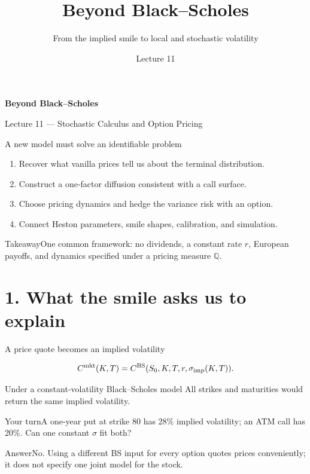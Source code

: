 \documentclass[handout,10pt,t,aspectratio=169]{beamer}
\title{Beyond Black--Scholes}\subtitle{From the implied smile to local and stochastic volatility}\author{}\date{Lecture 11}
\newenvironment{pausebox}{\begin{block}{Your turn}}{\end{block}}
\newenvironment{answerbox}{\begin{exampleblock}{Answer}}{\end{exampleblock}}
\newenvironment{keybox}{\begin{exampleblock}{Takeaway}}{\end{exampleblock}}
\newcommand{\Q}{\mathbb Q}
\begin{document}
\begin{frame}[plain]\vfill
            {\LARGE\bfseries\color{CourseBlue}Beyond Black--Scholes\par}
            \medskip{\color{CourseGold}\rule{.94\textwidth}{.8pt}}
            \medskip Lecture 11 --- Stochastic Calculus and Option Pricing\vfill
            \end{frame}

\begin{frame}{A new model must solve an identifiable problem}

    \begin{enumerate}
    \item Recover what vanilla prices tell us about the terminal distribution.
    \item Construct a one-factor diffusion consistent with a call surface.
    \item Choose pricing dynamics and hedge the variance risk with an option.
    \item Connect Heston parameters, smile shapes, calibration, and simulation.
    \end{enumerate}
    \begin{keybox}One common framework: no dividends, a constant rate \(r\),
    European payoffs, and dynamics specified under a pricing measure \(\Q\).
    \end{keybox}
\end{frame}

\section{1. What the smile asks us to explain}

\begin{frame}{A price quote becomes an implied volatility}

    \[C^{\rm mkt}(K,T)=C^{\rm BS}(S_0,K,T,r,\sigma_{\rm imp}(K,T)).\]
    \begin{block}{Under a constant-volatility Black--Scholes model}
    All strikes and maturities would return the same implied volatility.
    \end{block}
    \begin{pausebox}A one-year put at strike 80 has 28\% implied volatility;
    an ATM call has 20\%. Can one constant \(\sigma\) fit both?\end{pausebox}
    \begin{answerbox}No. Using a different BS input for every option quotes
    prices conveniently; it does not specify one joint model for the stock.\end{answerbox}
\end{frame}
\end{document}
